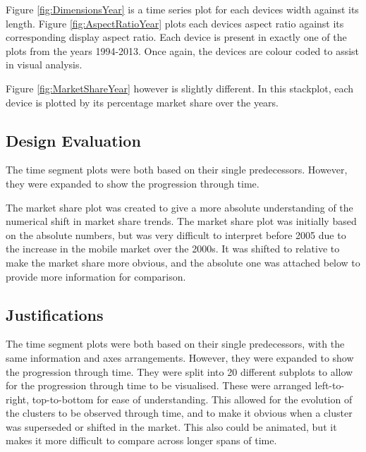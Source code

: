 \documentclass[conference]{IEEEtran}
\begin{document}
Figure \ref{fig:DimensionsYear} is a time series plot for each devices width against its length. Figure \ref{fig:AspectRatioYear} plots each devices aspect ratio against its corresponding display aspect ratio. Each device is present in exactly one of the plots from the years 1994-2013. Once again, the devices are colour coded to assist in visual analysis.

Figure \ref{fig:MarketShareYear} however is slightly different. In this stackplot, each device is plotted by its percentage market share over the years. 
\subsection{Design Evaluation}

The time segment plots were both based on their single predecessors. However, they were expanded to show the progression through time.

The market share plot was created to give a more absolute understanding of the numerical shift in market share trends.
The market share plot was initially based on the absolute numbers, but was very difficult to interpret before 2005 due to the increase in the mobile market over the 2000s. It was shifted to relative to make the market share more obvious, and the absolute one was attached below to provide more information for comparison.

\subsection{Justifications}

The time segment plots were both based on their single predecessors, with the same information and axes arrangements. However, they were expanded to show the progression through time.
They were split into 20 different subplots to allow for the progression through time to be visualised. These were arranged left-to-right, top-to-bottom for ease of understanding. 
This allowed for the evolution of the clusters to be observed through time, and to make it obvious when a cluster was superseded or shifted in the market.
This also could be animated, but it makes it more difficult to compare across longer spans of time.
\end{document}
